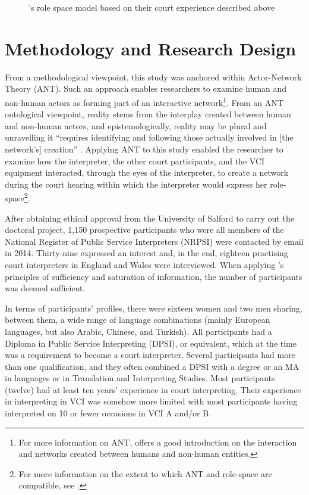 \documentclass[output=paper]{langsci/langscibook}
\begin{document}
  
 

\begin{figure}
\caption{\citet{Llewellyn-Jones2014}’s role space model based on their court experience described above}
\end{figure}

\section{Methodology and Research Design}

From a methodological viewpoint, this study was anchored within Actor-Network Theory (\textsc{ANT}). Such an approach enables researchers to examine human and non-human actors as forming part of an interactive network\footnote{For more information on \textsc{ANT}, \citet{Latour2005} offers a good introduction on the interaction and networks created between humans and non-human entities.}. From an \textsc{ANT} ontological viewpoint, reality stems from the interplay created between human and non-human actors, and epistemologically, reality may be plural and unravelling it “requires identifying and following those actually involved in [the network’s] creation” \citep[112]{Bonner2013}. Applying \textsc{ANT} to this study enabled the researcher to examine how the interpreter, the other court participants, and the \textsc{VCI} equipment interacted, through the eyes of the interpreter, to create a network during the court hearing within which the interpreter would express her role-space\footnote{For more information on the extent to which \textsc{ANT} and role-space are compatible, see \citet{Devaux2017b}.}. 

After obtaining ethical approval from the University of Salford to carry out the doctoral project, 1,150 prospective participants who were all members of the National Register of Public Service Interpreters (\textsc{NRPSI}) were contacted by email in 2014. Thirty-nine expressed an interest and, in the end, eighteen practising court interpreters in England and Wales were interviewed. When applying \citet{Seidman2006}’s principles of sufficiency and saturation of information, the number of participants was deemed sufficient. 

In terms of participants’ profiles, there were sixteen women and two men sharing, between them, a wide range of language combinations (mainly European languages, but also Arabic, Chinese, and Turkish). All participants had a Diploma in Public Service Interpreting (\textsc{DPSI}), or equivalent, which at the time was a requirement to become a court interpreter. Several participants had more than one qualification, and they often combined a \textsc{DPSI} with a degree or an MA in languages or in Translation and Interpreting Studies. Most participants (twelve) had at least ten years’ experience in court interpreting. Their experience in interpreting in \textsc{VCI} was somehow more limited with most participants having interpreted on 10 or fewer occasions in \textsc{VCI} A and/or B.   
\end{document}
